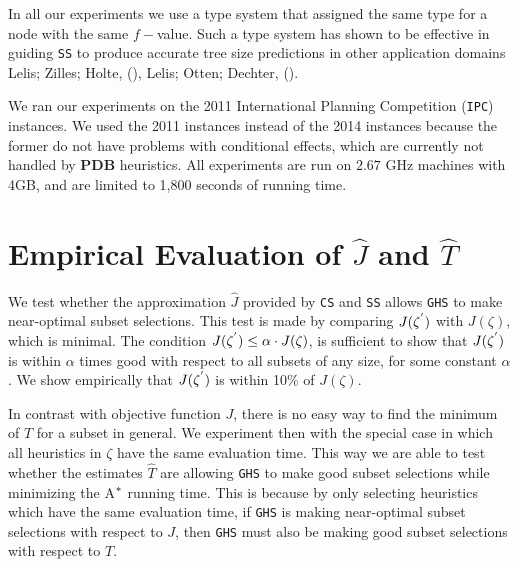 In all our experiments we use a type system that assigned the same type for a node with the same $f-$value. Such a type system has shown to be effective in guiding \texttt{SS} to produce accurate tree size predictions in other application domains Lelis; Zilles; Holte, (\citeyear{lelis2013predicting}), Lelis; Otten; Dechter,  (\citeyear{lelis2014memory}).

We ran our experiments on the 2011 International Planning Competition (\texttt{IPC}) instances. We used the 2011 instances instead of the 2014 instances because the former do not have problems with conditional effects, which are currently not handled by \textbf{PDB} heuristics. All experiments are run on $2.67$ GHz machines with 4GB, and are limited to 1,800 seconds of running time.\\

\section{Empirical Evaluation of $\hat{J}$ and $\hat{T}$}
\noindent
We test whether the approximation $\hat{J}$ provided by \texttt{CS} and \texttt{SS} allows \texttt{GHS} to make near-optimal subset selections. This test is made by comparing $J(\zeta\sp{'})$ with $J(\zeta)$, which is minimal. The condition $J(\zeta\sp{'}) \leq \alpha \cdot J(\zeta)$, is sufficient to show that $J(\zeta\sp{'})$ is within $\alpha$ times good with respect to all subsets of any size, for some constant $\alpha$. We show empirically that $J(\zeta\sp{'})$ is within 10\% of $J(\zeta)$. 

In contrast with objective function $J$, there is no easy way to find the minimum of $T$ for a subset in general. We experiment then with the special case in which all heuristics in $\zeta$ have the same evaluation time. This way we are able to test whether the estimates $\hat{T}$ are allowing \texttt{GHS} to make good subset selections while minimizing the A$\sp{*}$ running time. This is because by only selecting heuristics which have the same evaluation time, if \texttt{GHS} is making near-optimal subset selections with respect to $J$, then \texttt{GHS} must also be making good subset selections with respect to $T$.


